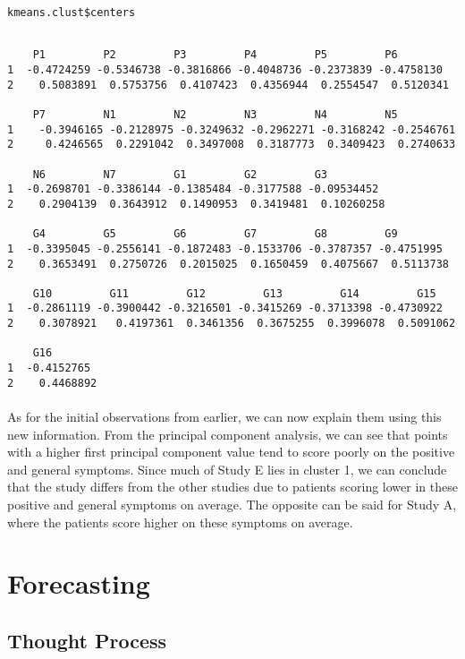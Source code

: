 \documentclass{article}
\begin{document}
\begin{lstlisting}
kmeans.clust$centers
\end{lstlisting}

\begin{lstlisting}

    P1         P2         P3         P4         P5         P6
1  -0.4724259 -0.5346738 -0.3816866 -0.4048736 -0.2373839 -0.4758130
2 	 0.5083891  0.5753756  0.4107423  0.4356944  0.2554547  0.5120341

    P7         N1         N2         N3         N4         N5
1 	 -0.3946165 -0.2128975 -0.3249632 -0.2962271 -0.3168242 -0.2546761
2 	  0.4246565  0.2291042  0.3497008  0.3187773  0.3409423  0.2740633

    N6         N7         G1         G2         G3
1  -0.2698701 -0.3386144 -0.1385484 -0.3177588 -0.09534452
2 	 0.2904139  0.3643912  0.1490953  0.3419481  0.10260258

    G4         G5         G6         G7         G8         G9
1  -0.3395045 -0.2556141 -0.1872483 -0.1533706 -0.3787357 -0.4751995
2 	 0.3653491  0.2750726  0.2015025  0.1650459  0.4075667  0.5113738
 
    G10         G11         G12         G13         G14         G15
1  -0.2861119 -0.3900442 -0.3216501 -0.3415269 -0.3713398 -0.4730922
2 	 0.3078921   0.4197361  0.3461356  0.3675255  0.3996078  0.5091062

    G16
1  -0.4152765
2 	 0.4468892
\end{lstlisting}

\paragraph{}As for the initial observations from earlier, we can now explain them using this new information. From the principal component analysis, we can see that points with a higher first principal component value tend to score poorly on the positive and general symptoms. Since much of Study E lies in cluster 1, we can conclude that the study differs from the other studies due to patients scoring lower in these positive and general symptoms on average. The opposite can be said for Study A, where the patients score higher on these symptoms on average.


\section{Forecasting}
	\subsection{Thought Process} 
\end{document}
